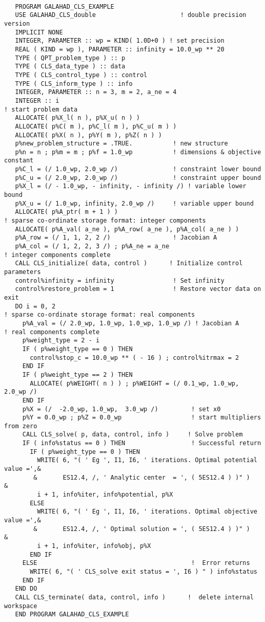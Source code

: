 \documentclass{galahad}
\begin{document}
{\tt \small
\begin{verbatim}
   PROGRAM GALAHAD_CLS_EXAMPLE
   USE GALAHAD_CLS_double                       ! double precision version
   IMPLICIT NONE
   INTEGER, PARAMETER :: wp = KIND( 1.0D+0 ) ! set precision
   REAL ( KIND = wp ), PARAMETER :: infinity = 10.0_wp ** 20
   TYPE ( QPT_problem_type ) :: p
   TYPE ( CLS_data_type ) :: data
   TYPE ( CLS_control_type ) :: control        
   TYPE ( CLS_inform_type ) :: info
   INTEGER, PARAMETER :: n = 3, m = 2, a_ne = 4 
   INTEGER :: i
! start problem data
   ALLOCATE( p%X_l( n ), p%X_u( n ) )
   ALLOCATE( p%C( m ), p%C_l( m ), p%C_u( m ) )
   ALLOCATE( p%X( n ), p%Y( m ), p%Z( n ) )
   p%new_problem_structure = .TRUE.           ! new structure
   p%n = n ; p%m = m ; p%f = 1.0_wp           ! dimensions & objective constant
   p%C_l = (/ 1.0_wp, 2.0_wp /)               ! constraint lower bound
   p%C_u = (/ 2.0_wp, 2.0_wp /)               ! constraint upper bound
   p%X_l = (/ - 1.0_wp, - infinity, - infinity /) ! variable lower bound
   p%X_u = (/ 1.0_wp, infinity, 2.0_wp /)     ! variable upper bound
   ALLOCATE( p%A_ptr( m + 1 ) )
! sparse co-ordinate storage format: integer components
   ALLOCATE( p%A_val( a_ne ), p%A_row( a_ne ), p%A_col( a_ne ) )
   p%A_row = (/ 1, 1, 2, 2 /)                 ! Jacobian A
   p%A_col = (/ 1, 2, 2, 3 /) ; p%A_ne = a_ne
! integer components complete   
   CALL CLS_initialize( data, control )      ! Initialize control parameters
   control%infinity = infinity                ! Set infinity
   control%restore_problem = 1                ! Restore vector data on exit
   DO i = 0, 2
! sparse co-ordinate storage format: real components
     p%A_val = (/ 2.0_wp, 1.0_wp, 1.0_wp, 1.0_wp /) ! Jacobian A
! real components complete   
     p%weight_type = 2 - i
     IF ( p%weight_type == 0 ) THEN
       control%stop_c = 10.0_wp ** ( - 16 ) ; control%itrmax = 2
     END IF
     IF ( p%weight_type == 2 ) THEN
       ALLOCATE( p%WEIGHT( n ) ) ; p%WEIGHT = (/ 0.1_wp, 1.0_wp, 2.0_wp /)
     END IF
     p%X = (/  -2.0_wp, 1.0_wp,  3.0_wp /)         ! set x0
     p%Y = 0.0_wp ; p%Z = 0.0_wp                   ! start multipliers from zero
     CALL CLS_solve( p, data, control, info )     ! Solve problem
     IF ( info%status == 0 ) THEN                  ! Successful return
       IF ( p%weight_type == 0 ) THEN
         WRITE( 6, "( ' Eg ', I1, I6, ' iterations. Optimal potential value =',&
        &       ES12.4, /, ' Analytic center  = ', ( 5ES12.4 ) )" )            &
         i + 1, info%iter, info%potential, p%X
       ELSE
         WRITE( 6, "( ' Eg ', I1, I6, ' iterations. Optimal objective value =',&
        &       ES12.4, /, ' Optimal solution = ', ( 5ES12.4 ) )" )            &
         i + 1, info%iter, info%obj, p%X
       END IF
     ELSE                                          !  Error returns
       WRITE( 6, "( ' CLS_solve exit status = ', I6 ) " ) info%status
     END IF
   END DO
   CALL CLS_terminate( data, control, info )      !  delete internal workspace
   END PROGRAM GALAHAD_CLS_EXAMPLE
\end{verbatim}
}
\end{document}
